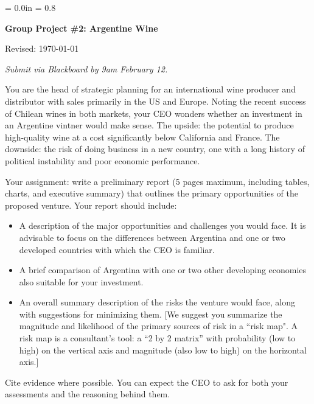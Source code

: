 \documentclass[letterpaper,12pt]{article}
\def\HeadName{Group Project \#2}
\begin{document}
\parindent = 0.0in
\parskip = 0.8\bigskipamount
\thispagestyle{empty}%
\Head

\centerline{\large \bf \HeadName:  Argentine Wine}%
\centerline{Revised:  \today}

\medskip
{\it Submit via Blackboard by 9am February 12.}
\medskip

You are the head of strategic planning for an international wine producer and distributor
with sales primarily in the US and Europe.
Noting the recent success of Chilean wines in both markets,
your CEO wonders whether an investment in an Argentine vintner would make sense.
The upside:  the potential to produce high-quality wine at a cost
significantly below California and France.
The downside:  the risk of doing business in a new country,
one with a long history of political instability and poor economic performance.


Your assignment:  write a preliminary report (5 pages maximum,
including tables, charts, and executive summary) that outlines the primary opportunities of the proposed venture.  
Your report should include:  
%
\begin{itemize}%

\item A description of the major opportunities and challenges
you would face.  It is advisable to focus on the differences between
Argentina and one or two developed countries with which the CEO is familiar.

\item A brief comparison of Argentina with one or two other developing
economies also suitable for your investment.

\item An overall summary description of the risks the venture would
face, along with suggestions for minimizing them. 
[We suggest you summarize the magnitude and likelihood of the primary
sources of risk in a ``risk map".  A risk map is a consultant's tool:
a ``2 by 2 matrix'' with probability (low to high) on the
vertical axis and magnitude (also low to high) on the horizontal
axis.] 

\end{itemize}
%
Cite evidence where possible.  
You can expect the CEO to ask for both your 
assessments and the reasoning behind them.  
\end{document}
